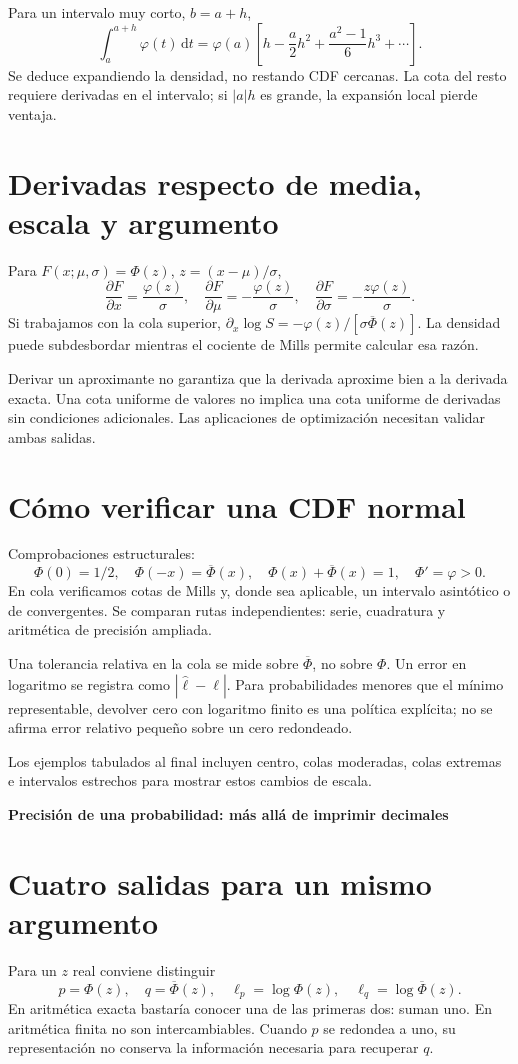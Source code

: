 \documentclass[11pt,a4paper]{article}
\newcommand{\dd}{\,\mathrm d}
\theoremstyle{definition}
\newcommand{\parte}[1]{\par\bigskip\Needspace{8\baselineskip}\begin{center}{\Large\bfseries\color{azul}#1}\end{center}}
\newcommand{\ph}{\varphi}
\newcommand{\Q}{\overline\Phi}
\newcommand{\SF}{\overline\Phi}
\begin{document}
Para un intervalo muy corto, $b=a+h$,
\[
\int_a^{a+h}\ph(t)\dd t
=\ph(a)\left[h-\frac a2h^2+\frac{a^2-1}{6}h^3+\cdots\right].
\]
Se deduce expandiendo la densidad, no restando CDF cercanas. La cota del resto requiere derivadas en el intervalo; si $|a|h$ es grande, la expansión local pierde ventaja.

\section{Derivadas respecto de media, escala y argumento}
Para $F(x;\mu,\sigma)=\Phi(z)$, $z=(x-\mu)/\sigma$,
\[
\frac{\partial F}{\partial x}=\frac{\ph(z)}\sigma,\quad
\frac{\partial F}{\partial\mu}=-\frac{\ph(z)}\sigma,\quad
\frac{\partial F}{\partial\sigma}=-\frac{z\ph(z)}\sigma.
\]
Si trabajamos con la cola superior,
$\partial_x\log S=-\ph(z)/[\sigma\Q(z)]$.
La densidad puede subdesbordar mientras el cociente de Mills permite calcular esa razón.

Derivar un aproximante no garantiza que la derivada aproxime bien a la derivada exacta. Una cota uniforme de valores no implica una cota uniforme de derivadas sin condiciones adicionales. Las aplicaciones de optimización necesitan validar ambas salidas.

\section{Cómo verificar una CDF normal}
Comprobaciones estructurales:
\[
\Phi(0)=1/2,\quad \Phi(-x)=\Q(x),\quad
\Phi(x)+\Q(x)=1,\quad \Phi'\!=\ph>0.
\]
En cola verificamos cotas de Mills y, donde sea aplicable, un intervalo asintótico o de convergentes. Se comparan rutas independientes: serie, cuadratura y aritmética de precisión ampliada.

Una tolerancia relativa en la cola se mide sobre $\Q$, no sobre $\Phi$. Un error en logaritmo se registra como $|\widehat\ell-\ell|$. Para probabilidades menores que el mínimo representable, devolver cero con logaritmo finito es una política explícita; no se afirma error relativo pequeño sobre un cero redondeado.

Los ejemplos tabulados al final incluyen centro, colas moderadas, colas extremas e intervalos estrechos para mostrar estos cambios de escala.



\parte{Precisión de una probabilidad: más allá de imprimir decimales}
\section{Cuatro salidas para un mismo argumento}
Para un $z$ real conviene distinguir
\[
p=\Phi(z),\quad q=\SF(z),\quad \ell_p=\log\Phi(z),\quad
\ell_q=\log\SF(z).
\]
En aritmética exacta bastaría conocer una de las primeras dos: suman uno. En aritmética finita no son intercambiables. Cuando $p$ se redondea a uno, su representación no conserva la información necesaria para recuperar $q$.
\end{document}
